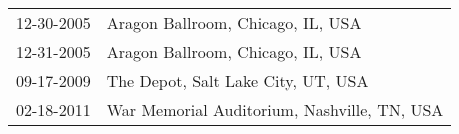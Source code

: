 \begin{supertabular}{ll}
 12-30-2005 &            Aragon Ballroom, Chicago, IL, USA \\
 12-31-2005 &            Aragon Ballroom, Chicago, IL, USA \\
 09-17-2009 &           The Depot, Salt Lake City, UT, USA \\
 02-18-2011 &  War Memorial Auditorium, Nashville, TN, USA \\
\end{supertabular}
